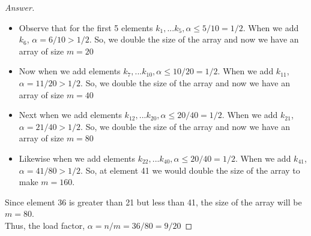 \documentclass[11pt]{article}
\theoremstyle{definition}
\theoremstyle{definition}
\theoremstyle{definition}
\begin{document}
\begin{proof}[Answer]
\begin{itemize}
\item Observe that for the first 5 elements $k_1,...k_5, \alpha \leq 5/10 = 1/2$. When we add $k_6$, $\alpha=6/10 > 1/2$. So, we double the size of the array and now we have an array of size $m=20$
\item Now when we add elements $k_7,...k_10, \alpha \leq 10/20 = 1/2$. When we add $k_{11}$, $\alpha=11/20 > 1/2$. So, we double the size of the array and now we have an array of size $m=40$
\item Next when we add elements $k_12,...k_20, \alpha \leq 20/40 = 1/2$. When we add $k_{21}$, $\alpha=21/40 > 1/2$. So, we double the size of the array and now we have an array of size $m=80$
\item Likewise when we add elements $k_22,...k_40, \alpha \leq 20/40 = 1/2$. When we add $k_{41}$, $\alpha=41/80 > 1/2$. So, at element 41 we would double the size of the array to make $m=160$.
\end{itemize}
Since element 36 is greater than 21 but less than 41, the size of the array will be $m=80$. \\
Thus, the load factor, $\alpha= n/m = 36/80= 9/20$
\end{proof}
\end{document}
